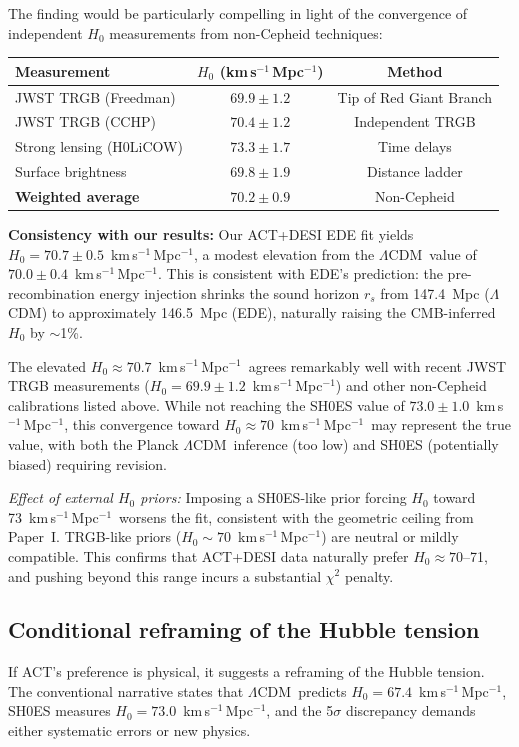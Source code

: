 \documentclass[twocolumn,showpacs,preprintnumbers,amsmath,amssymb,prd]{revtex4-2}
\newcommand{\lcdm}{$\Lambda$CDM}
\newcommand{\kms}{km\,s$^{-1}$\,Mpc$^{-1}$}
\begin{document}
The finding would be particularly compelling in light of the convergence 
of independent $H_0$ measurements from non-Cepheid techniques:
\begin{center}
\begin{tabular}{lcc}
\toprule
Measurement & $H_0$ (\kms) & Method \\
\midrule
JWST TRGB (Freedman) & $69.9 \pm 1.2$ & Tip of Red Giant Branch \\
JWST TRGB (CCHP) & $70.4 \pm 1.2$ & Independent TRGB \\
Strong lensing (H0LiCOW) & $73.3 \pm 1.7$ & Time delays \\
Surface brightness & $69.8 \pm 1.9$ & Distance ladder \\
\midrule
\textbf{Weighted average} & $\mathbf{70.2 \pm 0.9}$ & Non-Cepheid \\
\bottomrule
\end{tabular}
\end{center}

\textbf{Consistency with our results:} Our ACT+DESI EDE fit yields 
$H_0 = 70.7 \pm 0.5$~\kms, a modest elevation from the \lcdm\ value of 
$70.0 \pm 0.4$~\kms. This is consistent with EDE's prediction: the 
pre-recombination energy injection shrinks the sound horizon 
$r_s$ from 147.4~Mpc (\lcdm) to approximately 146.5~Mpc (EDE), 
naturally raising the CMB-inferred $H_0$ by $\sim$1\%.

The elevated $H_0 \approx 70.7$~\kms\ agrees remarkably well with recent 
JWST TRGB measurements ($H_0 = 69.9 \pm 1.2$~\kms) and other non-Cepheid 
calibrations listed above. While not reaching the SH0ES value of 
$73.0 \pm 1.0$~\kms, this convergence toward $H_0 \approx 70$~\kms\ 
may represent the true value, with both the Planck \lcdm\ inference 
(too low) and SH0ES (potentially biased) requiring revision.

\emph{Effect of external $H_0$ priors:} Imposing a SH0ES-like prior forcing 
$H_0$ toward 73~\kms\ worsens the fit, consistent with the geometric ceiling 
from Paper~I. TRGB-like priors ($H_0 \sim 70$~\kms) are neutral or mildly 
compatible. This confirms that ACT+DESI data naturally prefer $H_0 \approx 70$--71, 
and pushing beyond this range incurs a substantial $\chi^2$ penalty.

\subsection{Conditional reframing of the Hubble tension}

If ACT's preference is physical, it suggests a reframing of the Hubble tension.
The conventional narrative states that \lcdm\ predicts $H_0 = 67.4$~\kms, 
SH0ES measures $H_0 = 73.0$~\kms, and the 5$\sigma$ discrepancy demands 
either systematic errors or new physics.
\end{document}
